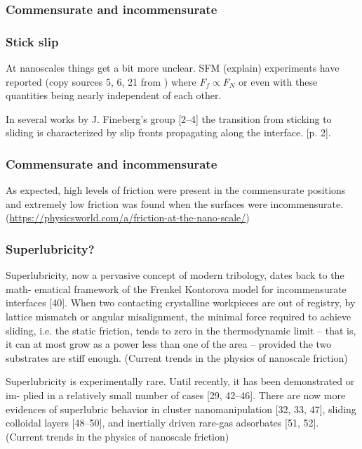 \subsubsection{Commensurate and incommensurate}
\subsubsection{Stick slip}



At nanoscales things get a bit more unclear. SFM (explain) experiments have reported (copy sources 5, 6, 21 from \cite{mo_friction_2009})
where $F_f \propto F_N$ or even with these quantities being nearly independent of each other.








In several works by J. Fineberg’s group [2–4] the transition from sticking to sliding is characterized by slip fronts propagating along the
interface. \cite{Manini_2017}[p. 2]. 

\subsubsection{Commensurate and incommensurate}
As expected, high levels of friction were present in the commensurate positions and extremely low friction was found when the surfaces were
incommensurate. (\url{https://physicsworld.com/a/friction-at-the-nano-scale/})


\subsubsection{Superlubricity?}
Superlubricity, now a pervasive concept of modern tribology, dates back to the math- ematical framework of the Frenkel Kontorova model for
incommensurate interfaces [40]. When two contacting crystalline workpieces are out of registry, by lattice mismatch or angular misalignment,
the minimal force required to achieve sliding, i.e. the static friction, tends to zero in the thermodynamic limit – that is, it can at most
grow as a power less than one of the area – provided the two substrates are stiff enough. (Current trends in the physics of nanoscale
friction)


Superlubricity is experimentally rare. Until recently, it has been demonstrated or im- plied in a relatively small number of cases [29,
42–46]. There are now more evidences of superlubric behavior in cluster nanomanipulation [32, 33, 47], sliding colloidal layers [48–50], and
inertially driven rare-gas adsorbates [51, 52]. (Current trends in the physics of nanoscale friction)


